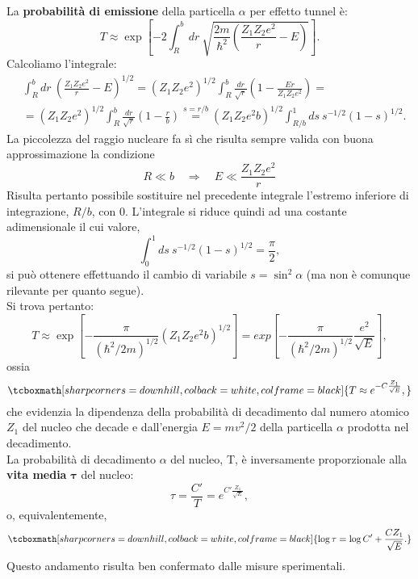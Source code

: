 \documentclass[a4paper,12pt,oneside]{book}
\begin{document}
La \textbf{probabilità di emissione} della particella $\alpha$ per effetto tunnel è:
	\begin{equation}
		T \approx \exp \left[ -2 \int _R ^b dr\ \sqrt{\frac{2m}{\hbar ^2}\left(\frac{Z_1 Z_2 e^2}{r}-E\right)}\right].
	\end{equation}
Calcoliamo l'integrale:
	\begin{align}
		&\displaystyle{\int _R ^b dr\ \left(\frac{Z_1 Z_2 e^2}{r}-E\right)^{1/2}=\left(Z_1 Z_2 e^2\right)^{1/2}\int _R ^b \frac{dr}{\sqrt{r}}\left(1-\frac{Er}{Z_1 Z_2 e^2}\right)=}\nonumber \\
		&\displaystyle{=\left(Z_1 Z_2 e^2\right)^{1/2}\int _R ^b \frac{dr}{\sqrt{r}}\left(1-\frac{r}{b}\right)\overset{s=r/b}{=}}\displaystyle{\left(Z_1 Z_2 e^2 b\right)^{1/2}\int _{R/b} ^1 ds\ s^{-1/2} (1-s)^{1/2}}.
	\end{align}
La piccolezza del raggio nucleare fa sì che risulta sempre valida con buona approssimazione la condizione
	\begin{equation}
		R\ll b \quad \Rightarrow \quad E \ll \frac{Z_1 Z_2 e^2}{r}
	\end{equation}
Risulta pertanto possibile sostituire nel precedente integrale l'estremo inferiore di integrazione, $R/b$, con $0$. L'integrale si riduce quindi ad una costante adimensionale il cui valore,
	\begin{equation}
		\int _{0} ^1 ds\ s^{-1/2} (1-s)^{1/2}= \frac{\pi}{2},
	\end{equation}
si può ottenere effettuando il cambio di variabile $s= \sin^2 \alpha$ (ma non è comunque rilevante per quanto segue).\\
Si trova pertanto:
	\begin{equation}
		T\approx  \exp \left[ -\frac{\pi}{(\hbar ^2 /2m)^{1/2}}\left(Z_1 Z_2 e^2 b\right)^{1/2}\right]=  exp \left[ -\frac{\pi}{(\hbar ^2 /2m)^{1/2}}\frac{e^2}{\sqrt{E}}\right],
	\end{equation}
ossia
	\begin{equation}
		\tcboxmath[sharp corners=downhill, colback=white, colframe=black]{
			T \approx e^{-C\frac{Z_1}{\sqrt{E}}},
			}
	\end{equation}
che evidenzia la dipendenza della probabilità di decadimento dal numero atomico $Z_1$ del nucleo che decade e dall'energia $E=mv^2/2$ della particella $\alpha$ prodotta nel decadimento.\\

La probabilità di decadimento $\alpha$ del nucleo, T, è inversamente proporzionale alla \textbf{vita media} $\mathbf{\tau}$ del nucleo:
	\begin{equation}
		\tau=\frac{C'}{T}=e^{C'\frac{Z_1}{\sqrt{E}}},
	\end{equation}
o, equivalentemente,
	\begin{equation}
		\tcboxmath[sharp corners=downhill, colback=white, colframe=black]{
			\log \tau = \log C' + \frac{C Z_1}{\sqrt{E}}.
			}
	\end{equation}
Questo andamento risulta ben confermato dalle misure sperimentali.
\end{document}
